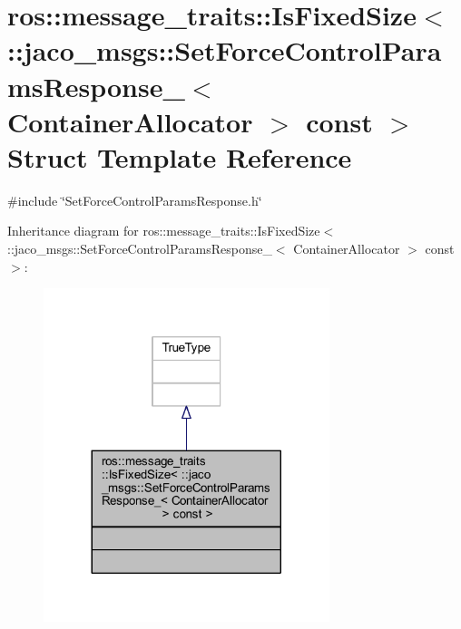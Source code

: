 \hypertarget{structros_1_1message__traits_1_1IsFixedSize_3_01_1_1jaco__msgs_1_1SetForceControlParamsResponse_11b3e344d69afcba56565de846761b50}{}\section{ros\+:\+:message\+\_\+traits\+:\+:Is\+Fixed\+Size$<$ \+:\+:jaco\+\_\+msgs\+:\+:Set\+Force\+Control\+Params\+Response\+\_\+$<$ Container\+Allocator $>$ const $>$ Struct Template Reference}
\label{structros_1_1message__traits_1_1IsFixedSize_3_01_1_1jaco__msgs_1_1SetForceControlParamsResponse_11b3e344d69afcba56565de846761b50}


{\ttfamily \#include \char`\"{}Set\+Force\+Control\+Params\+Response.\+h\char`\"{}}



Inheritance diagram for ros\+:\+:message\+\_\+traits\+:\+:Is\+Fixed\+Size$<$ \+:\+:jaco\+\_\+msgs\+:\+:Set\+Force\+Control\+Params\+Response\+\_\+$<$ Container\+Allocator $>$ const $>$\+:
\nopagebreak
\begin{figure}[H]
\begin{center}
\leavevmode
\includegraphics[width=236pt]{d7/dd1/structros_1_1message__traits_1_1IsFixedSize_3_01_1_1jaco__msgs_1_1SetForceControlParamsResponse_addf9ee854af27a7cb43e73b2e92e39b}
\end{center}
\end{figure}


